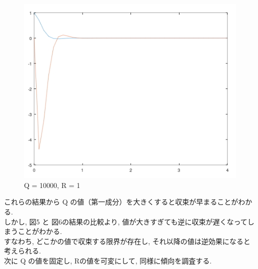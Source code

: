 \documentclass{jsarticle}
\begin{document}
\begin{figure}[h!]
\begin{minipage}{0.325\linewidth}
    \centering
    \includegraphics[width=\linewidth]{./fig/q10000_r1.png}
    \caption{Q = 10000, R = 1}
  \end{minipage}
\end{figure}

これらの結果から Q の値（第一成分）を大きくすると収束が早まることがわかる.\\
\hspace*{1zw}しかし, 図5 と 図6の結果の比較より, 値が大きすぎても逆に収束が遅くなってしまうことがわかる.\\
\hspace*{1zw}すなわち, どこかの値で収束する限界が存在し, それ以降の値は逆効果になると考えられる.\\

次に Q の値を固定し, Rの値を可変にして, 同様に傾向を調査する.
\end{document}
